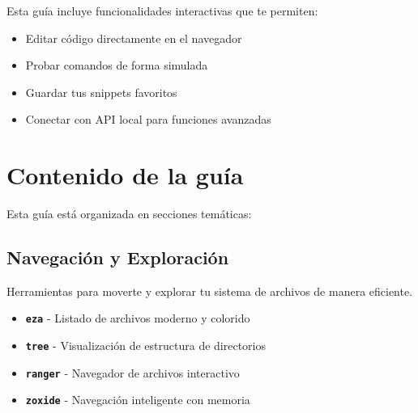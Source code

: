 \documentclass[
  11pt,
  letterpaper,
  oneside,
  openany]{scrbook}
\providecommand{\tightlist}{%
  \setlength{\itemsep}{0pt}\setlength{\parskip}{0pt}}
\begin{document}

\begin{tcolorbox}[enhanced jigsaw, toprule=.15mm, bottomrule=.15mm, opacityback=0, coltitle=black, rightrule=.15mm, colframe=quarto-callout-note-color-frame, titlerule=0mm, opacitybacktitle=0.6, left=2mm, colback=white, bottomtitle=1mm, arc=.35mm, leftrule=.75mm, title=\textcolor{quarto-callout-note-color}{\faInfo}\hspace{0.5em}{Note}, colbacktitle=quarto-callout-note-color!10!white, breakable, toptitle=1mm]

Esta guía incluye funcionalidades interactivas que te permiten:

\begin{itemize}
\tightlist
\item
  Editar código directamente en el navegador
\item
  Probar comandos de forma simulada
\item
  Guardar tus snippets favoritos
\item
  Conectar con API local para funciones avanzadas
\end{itemize}

\end{tcolorbox}

\section*{Contenido de la guía}\label{contenido-de-la-guuxeda}


Esta guía está organizada en secciones temáticas:

\subsection*{Navegación y
Exploración}\label{navegaciuxf3n-y-exploraciuxf3n}

Herramientas para moverte y explorar tu sistema de archivos de manera
eficiente.

\begin{itemize}
\tightlist
\item
  \textbf{\texttt{eza}} - Listado de archivos moderno y colorido
\item
  \textbf{\texttt{tree}} - Visualización de estructura de directorios
\item
  \textbf{\texttt{ranger}} - Navegador de archivos interactivo\\
\item
  \textbf{\texttt{zoxide}} - Navegación inteligente con memoria
\end{itemize}
\end{document}
